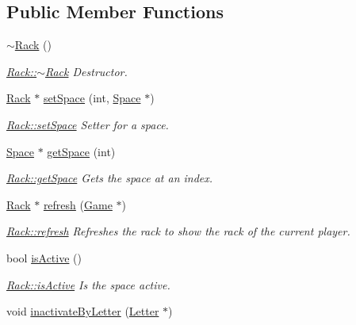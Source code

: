 \subsection*{Public Member Functions}
\begin{DoxyCompactItemize}
\item 
\hyperlink{class_rack_aa18464e4a5e7048969a95526c70b3afb}{$\sim$\-Rack} ()
\begin{DoxyCompactList}\small\item\em \hyperlink{class_rack_aa18464e4a5e7048969a95526c70b3afb}{Rack\-::$\sim$\-Rack} Destructor. \end{DoxyCompactList}\item 
\hyperlink{class_rack}{Rack} $\ast$ \hyperlink{class_rack_a3e38244d421dc2b984123b26698028e7}{set\-Space} (int, \hyperlink{class_space}{Space} $\ast$)
\begin{DoxyCompactList}\small\item\em \hyperlink{class_rack_a3e38244d421dc2b984123b26698028e7}{Rack\-::set\-Space} Setter for a space. \end{DoxyCompactList}\item 
\hyperlink{class_space}{Space} $\ast$ \hyperlink{class_rack_a2fdfa2264bb85c08ebf107e67cfc8657}{get\-Space} (int)
\begin{DoxyCompactList}\small\item\em \hyperlink{class_rack_a2fdfa2264bb85c08ebf107e67cfc8657}{Rack\-::get\-Space} Gets the space at an index. \end{DoxyCompactList}\item 
\hyperlink{class_rack}{Rack} $\ast$ \hyperlink{class_rack_ae1b5a6e15cb1ebe299356959b6a8d641}{refresh} (\hyperlink{class_game}{Game} $\ast$)
\begin{DoxyCompactList}\small\item\em \hyperlink{class_rack_ae1b5a6e15cb1ebe299356959b6a8d641}{Rack\-::refresh} Refreshes the rack to show the rack of the current player. \end{DoxyCompactList}\item 
bool \hyperlink{class_rack_a5bd6dd499aecf9239831aafc1679a768}{is\-Active} ()
\begin{DoxyCompactList}\small\item\em \hyperlink{class_rack_a5bd6dd499aecf9239831aafc1679a768}{Rack\-::is\-Active} Is the space active. \end{DoxyCompactList}\item 
void \hyperlink{class_rack_afdf845eb458b07ed6029d29672ab120f}{inactivate\-By\-Letter} (\hyperlink{class_letter}{Letter} $\ast$)

\end{DoxyCompactItemize}
